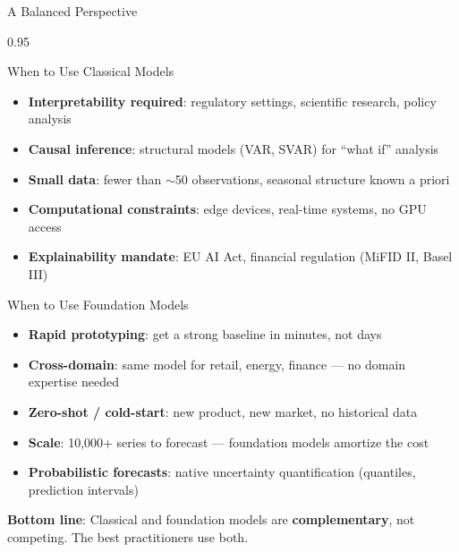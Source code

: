 \documentclass[9pt, aspectratio=169, t]{beamer}
\begin{document}
\begin{frame}{A Balanced Perspective}
    \begin{cminipage}{0.95\textwidth}
    \vspace{-0.3cm}
    \begin{alertblock}{When to Use Classical Models}
        {\scriptsize
        \begin{itemize}\setlength{\itemsep}{0pt}
            \item \textbf{Interpretability required}: regulatory settings, scientific research, policy analysis
            \item \textbf{Causal inference}: structural models (VAR, SVAR) for ``what if'' analysis
            \item \textbf{Small data}: fewer than $\sim$50 observations, seasonal structure known a priori
            \item \textbf{Computational constraints}: edge devices, real-time systems, no GPU access
            \item \textbf{Explainability mandate}: EU AI Act, financial regulation (MiFID II, Basel III)
        \end{itemize}
        }
    \end{alertblock}
    \vspace{-3mm}
    \begin{exampleblock}{When to Use Foundation Models}
        {\scriptsize
        \begin{itemize}\setlength{\itemsep}{0pt}
            \item \textbf{Rapid prototyping}: get a strong baseline in minutes, not days
            \item \textbf{Cross-domain}: same model for retail, energy, finance --- no domain expertise needed
            \item \textbf{Zero-shot / cold-start}: new product, new market, no historical data
            \item \textbf{Scale}: 10{,}000+ series to forecast --- foundation models amortize the cost
            \item \textbf{Probabilistic forecasts}: native uncertainty quantification (quantiles, prediction intervals)
        \end{itemize}
        }
    \end{exampleblock}
    \vspace{-3mm}
    \begin{block}{}
        {\scriptsize \textbf{Bottom line}: Classical and foundation models are \textbf{complementary}, not competing. The best practitioners use both.}
    \end{block}
    \end{cminipage}
\end{frame}
\end{document}
